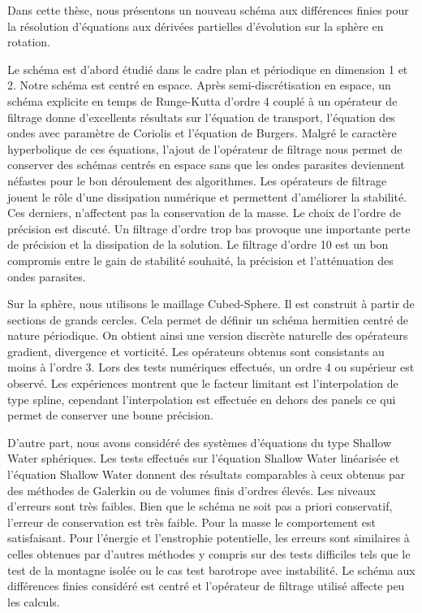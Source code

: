 
Dans cette thèse, nous présentons un nouveau schéma aux différences finies pour la résolution d'équations aux dérivées partielles d'évolution sur la sphère en rotation.

Le schéma est d'abord étudié dans le cadre plan et périodique en dimension 1 et 2. Notre schéma est centré en espace. Après semi-discrétisation en espace, un schéma explicite en temps de Runge-Kutta d'ordre 4 couplé à un opérateur de filtrage donne d'excellents résultats sur l'équation de transport, l'équation des ondes avec paramètre de Coriolis et l'équation de Burgers. Malgré le caractère hyperbolique de ces équations, l'ajout de l'opérateur de filtrage nous permet de conserver des schémas centrés en espace sans que les ondes parasites deviennent néfastes pour le bon déroulement des algorithmes. Les opérateurs de filtrage jouent le rôle d'une dissipation numérique et permettent d'améliorer la stabilité. Ces derniers, n'affectent pas la conservation de la masse. Le choix de l'ordre de précision est discuté. Un filtrage d'ordre trop bas provoque une importante perte de précision et la dissipation de la solution. Le filtrage d'ordre 10 est un bon compromis entre le gain de stabilité souhaité, la précision et l'atténuation des ondes parasites.

Sur la sphère, nous utilisons le maillage Cubed-Sphere. Il est construit à partir de sections de grands cercles. Cela permet de définir un schéma hermitien centré de nature périodique. On obtient ainsi une version discrète naturelle des opérateurs gradient, divergence et vorticité. Les opérateurs obtenus sont consistants au moins à l'ordre 3. Lors des tests numériques effectués, un ordre 4 ou supérieur est observé. Les expériences montrent que le facteur limitant est l'interpolation de type spline, cependant l'interpolation est effectuée en dehors des panels ce qui permet de conserver une bonne précision.

D'autre part, nous avons considéré des systèmes d'équations du type Shallow Water sphériques. Les tests effectués sur l'équation Shallow Water linéarisée et l'équation Shallow Water donnent des résultats comparables à ceux obtenus par des méthodes de Galerkin ou de volumes finis d'ordres élevés. Les niveaux d'erreurs sont très faibles. Bien que le schéma ne soit pas a priori conservatif, l'erreur de conservation est très faible. Pour la masse le comportement est satisfaisant. Pour l'énergie et l'enstrophie potentielle, les erreurs sont similaires à celles obtenues par d'autres méthodes y compris sur des tests difficiles tels que le test de la montagne isolée ou le cas test barotrope avec instabilité. Le schéma aux différences finies considéré est centré et l'opérateur de filtrage utilisé affecte peu les calculs.

